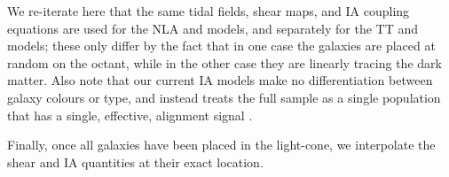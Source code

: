 We re-iterate here that the same tidal fields, shear maps, and IA coupling equations are used for the NLA and \dNLA models, and separately for the TT and \dTT models; these only differ by the fact that in one case the galaxies are placed at random on the octant, while in the other case they are linearly tracing the dark matter.
Also note that our current IA models make no differentiation between galaxy colours or type, and instead treats the full sample as a single population that has a single, effective, alignment signal \citep[see][for an example with a red/blue split]{DESY1_IA_Samuroff}.


Finally, once all galaxies have been placed in the light-cone, we interpolate the shear and IA quantities at their exact location.